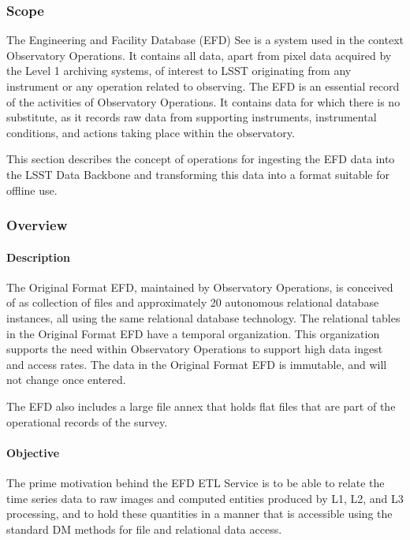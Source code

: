 \subsubsection{Scope}

The Engineering and Facility Database (EFD) See  is a system used in the
context Observatory Operations. It contains all data, apart from pixel
data acquired by the Level 1 archiving systems, of interest to LSST
originating from any instrument or any operation related to
observing. The EFD is an essential record of the activities of
Observatory Operations. It contains data for which there is no
substitute, as it records raw data from supporting instruments,
instrumental conditions, and actions taking place within the
observatory.

This section describes the concept of operations for ingesting the
EFD data into the LSST Data Backbone and transforming this data
into a format suitable for offline use.

\subsubsection{Overview}

\paragraph{Description}

The Original Format EFD, maintained by Observatory Operations, is
conceived of as collection of files and approximately 20 autonomous
relational database instances, all using the same relational database
technology. The relational tables in the Original Format EFD have a
temporal organization. This organization supports the need within
Observatory Operations to support high data ingest and access
rates. The data in the Original Format EFD is immutable, and will not
change once entered.

The EFD also includes a large file annex that holds flat files that
are part of the operational records of the survey.

\paragraph{Objective}

The prime motivation behind the EFD ETL Service is to be able to
relate the time series data to raw images and computed entities
produced by L1, L2, and L3 processing, and to hold these quantities in
a manner that is accessible using the standard DM methods for file and
relational data access.

